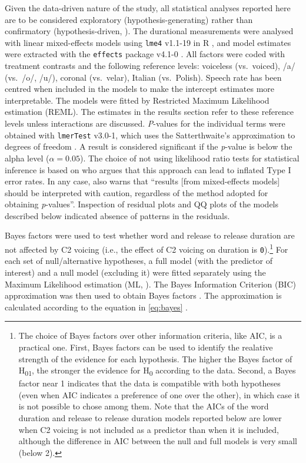 \documentclass[charis]{glossa}
\begin{document}
Given the data-driven nature of the study, all statistical analyses
reported here are to be considered exploratory (hypothesis-generating)
rather than confirmatory (hypothesis-driven,
\citealt{kerr1998, gelman2013, roettger2019}). The durational
measurements were analysed with linear mixed-effects models using
\texttt{lme4} v1.1-19 in R \citep{bates2015}, and model estimates were
extracted with the \texttt{effects} package v4.1-0 \citep{fox2003}. All
factors were coded with treatment contrasts and the following reference
levels: voiceless (vs.~voiced), /a/ (vs.~/o/, /u/), coronal (vs.~velar),
Italian (vs.~Polish). Speech rate has been centred when included in the
models to make the intercept estimates more interpretable. The models
were fitted by Restricted Maximum Likelihood estimation (REML). The
estimates in the results section refer to these reference levels unless
interactions are discussed. \emph{P}-values for the individual terms
were obtained with \texttt{lmerTest} v3.0-1, which uses the
Satterthwaite's approximation to degrees of freedom
\citep{kuznetsova2017, luke2017}. A result is considered significant if
the \emph{p}-value is below the alpha level (\(\alpha = 0.05\)). The
choice of not using likelihood ratio tests for statistical inference is
based on \citet{luke2017} who argues that this approach can lead to
inflated Type I error rates. In any case, \citet[1501]{luke2017} also
warns that ``results {[}from mixed-effects models{]} should be
interpreted with caution, regardless of the method adopted for obtaining
\textit{p}-values''. Inspection of residual plots and QQ plots of the
models described below indicated absence of patterns in the residuals.

Bayes factors were used to test whether word and release to release
duration are not affected by C2 voicing (i.e., the effect of C2 voicing
on duration is
\texttt{0}).\footnote{The choice of Bayes factors over other information criteria, like AIC, is a practical one. First, Bayes factors can be used to identify the realative strength of the evidence for each hypothesis. The higher the Bayes factor of H\textsubscript{01}, the stronger the evidence for H\textsubscript{0} according to the data. Second, a Bayes factor near 1 indicates that the data is compatible with both hypotheses (even when AIC indicates a preference of one over the other), in which case it is not possible to chose among them. Note that the AICs of the word duration and release to release duration models reported below are lower when C2 voicing is not included as a predictor than when it is included, although the difference in AIC between the null and full models is very small (below 2).}
For each set of null/alternative hypotheses, a full model (with the
predictor of interest) and a null model (excluding it) were fitted
separately using the Maximum Likelihood estimation (ML,
\citealt[34]{bates2015}). The Bayes Information Criterion (BIC)
approximation was then used to obtain Bayes factors
\citep{raftery1995, raftery1999, wagenmakers2007, jarosz2014}. The
approximation is calculated according to the equation in \ref{eq:bayes}
\citep[796]{wagenmakers2007}.
\end{document}

